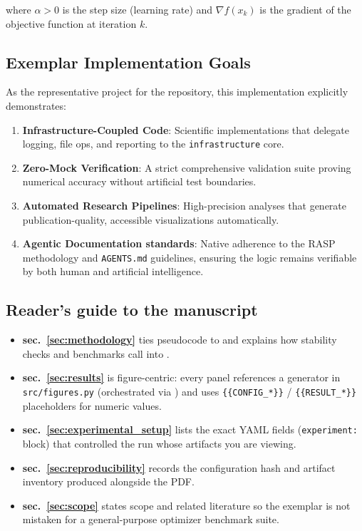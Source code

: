 \documentclass[
]{article}
\providecommand{\tightlist}{%
  \setlength{\itemsep}{0pt}\setlength{\parskip}{0pt}}
\begin{document}
where \(\alpha > 0\) is the step size (learning rate) and
\(\nabla f(x_k)\) is the gradient of the objective function at iteration
\(k\).

\subsection{Exemplar Implementation
Goals}\label{exemplar-implementation-goals}

As the representative project for the repository, this implementation
explicitly demonstrates:

\begin{enumerate}
\def\labelenumi{\arabic{enumi}.}
\tightlist
\item
  \textbf{Infrastructure-Coupled Code}: Scientific implementations that
  delegate logging, file ops, and reporting to the
  \texttt{infrastructure} core.
\item
  \textbf{Zero-Mock Verification}: A strict comprehensive validation
  suite proving numerical accuracy without artificial test boundaries.
\item
  \textbf{Automated Research Pipelines}: High-precision analyses that
  generate publication-quality, accessible visualizations automatically.
\item
  \textbf{Agentic Documentation standards}: Native adherence to the RASP
  methodology and \texttt{AGENTS.md} guidelines, ensuring the logic
  remains verifiable by both human and artificial intelligence.
\end{enumerate}

\subsection{Reader's guide to the
manuscript}\label{readers-guide-to-the-manuscript}

\begin{itemize}
\tightlist
\item
  \textbf{sec.~\ref{sec:methodology}} ties pseudocode to
   and explains how stability checks and
  benchmarks call into .
\item
  \textbf{sec.~\ref{sec:results}} is figure-centric: every panel
  references a generator in \texttt{src/figures.py} (orchestrated via
  ) and uses
  \texttt{\{\{CONFIG\_*\}\}} / \texttt{\{\{RESULT\_*\}\}} placeholders
  for numeric values.
\item
  \textbf{sec.~\ref{sec:experimental_setup}} lists the exact YAML fields
  (\texttt{experiment:} block) that controlled the run whose artifacts
  you are viewing.
\item
  \textbf{sec.~\ref{sec:reproducibility}} records the configuration hash
  and artifact inventory produced alongside the PDF.
\item
  \textbf{sec.~\ref{sec:scope}} states scope and related literature so
  the exemplar is not mistaken for a general-purpose optimizer benchmark
  suite.
\end{itemize}
\end{document}
